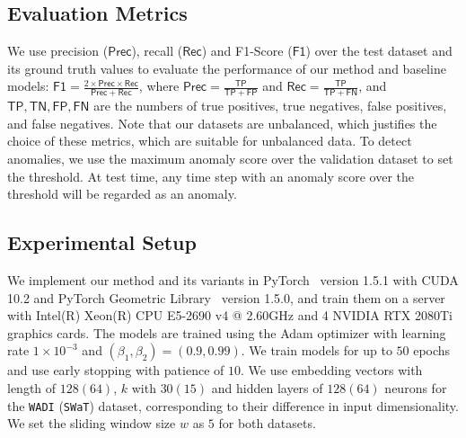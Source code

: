 \documentclass[letterpaper]{article} %
\begin{document}
\subsection{Evaluation Metrics}
We use precision ($\mathsf{Prec}$), recall ($\mathsf{Rec}$) and F1-Score ($\mathsf{F1}$) over the test dataset and its ground truth values to evaluate the performance of our method and baseline models: $\mathsf{F1}=\frac{2 \times \mathsf{Prec} \times \mathsf{Rec}}{\mathsf{Prec} + \mathsf{Rec}}$, where $\mathsf{Prec}=\frac{\mathsf{TP}}{\mathsf{TP}+\mathsf{FP}}$ and $\mathsf{Rec}=\frac{\mathsf{TP}}{\mathsf{TP}+\mathsf{FN}}$, and $\mathsf{TP}, \mathsf{TN}, \mathsf{FP}, \mathsf{FN}$ are the numbers of true positives, true negatives, false positives, and false negatives. Note that our datasets are unbalanced, which justifies the choice of these metrics, which are suitable for unbalanced data. To detect anomalies, we use the maximum anomaly score over the validation dataset to set the threshold. 
At test time, any time step with an anomaly score over the threshold will be regarded as an anomaly. 

\subsection{Experimental Setup}
We implement our method and its variants in PyTorch~\cite{paszke2017automatic} version 1.5.1 with CUDA 10.2 and PyTorch Geometric Library~\cite{Fey/Lenssen/2019} version 1.5.0, 
and train them on a server with Intel(R) Xeon(R) CPU E5-2690 v4 @ 2.60GHz and 4 NVIDIA RTX 2080Ti graphics cards. The models are trained using the Adam optimizer with learning rate $ 1 \times 10^{-3} $ and $ (\beta_1, \beta_2)=(0.9,0.99) $. We train models for up to $50$ epochs and use early stopping with patience of $10$. We use embedding vectors with length of $128(64)$, $k$ with $30(15)$ and hidden layers of $128 (64)$ neurons for the \texttt{WADI} (\texttt{SWaT}) dataset, corresponding to their difference in input dimensionality. We set the sliding window size $w$ as $5$ for both datasets.
\end{document}
